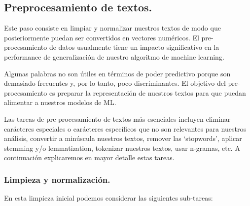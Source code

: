 \documentclass[12pt,a4paper]{article}
\begin{document}
\begin{sloppypar}
\subsection{Preprocesamiento de textos.}\label{Proces_textos}

Este paso consiste en limpiar y normalizar nuestros textos de modo que posteriormente puedan ser convertidos en vectores numéricos. El pre-procesamiento de datos usualmente tiene un impacto significativo en la performance de generalización de nuestro algoritmo de machine learning\cite{preprocessing}.

Algunas palabras no son útiles en términos de poder predictivo porque son demasiado frecuentes y, por lo tanto, poco discriminantes. El objetivo del pre-procesamiento es preparar la representación de nuestros textos para que puedan alimentar a nuestros modelos de ML.

Las tareas de pre-procesamiento de textos más esenciales incluyen eliminar carácteres especiales o carácteres específicos que no son relevantes para nuestros análisis, convertir a minúscula nuestros textos, remover las ‘stopwords’, aplicar stemming y/o lemmatization, tokenizar nuestros textos, usar n-gramas, etc. A continuación explicaremos en mayor detalle estas tareas\cite{NLP_2}.

\cleardoublepage

\subsubsection{Limpieza y normalización.}\label{Limpieza_y_norm}

En esta limpieza inicial podemos considerar las siguientes sub-tareas:
\begin{enumerate}


\end{enumerate}
\end{sloppypar}
\end{document}
